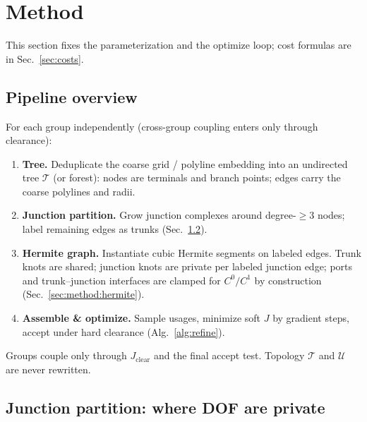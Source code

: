 
\section{Method}
\label{sec:method}

This section fixes the parameterization and the optimize loop; cost formulas
are in Sec.~\ref{sec:costs}.

\subsection{Pipeline overview}
\label{sec:method:pipeline}

For each group independently (cross-group coupling enters only through
clearance):

\begin{enumerate}
  \item \textbf{Tree.} Deduplicate the coarse grid / polyline embedding into an
        undirected tree $\mathcal{T}$ (or forest): nodes are terminals and
        branch points; edges carry the coarse polylines and radii.
  \item \textbf{Junction partition.} Grow junction complexes around
        degree-$\ge 3$ nodes; label remaining edges as trunks
        (Sec.~\ref{sec:method:partition}).
  \item \textbf{Hermite graph.} Instantiate cubic Hermite segments on labeled
        edges. Trunk knots are shared; junction knots are private per labeled
        junction edge; ports and trunk--junction interfaces are clamped for
        $C^{0}/C^{1}$ by construction (Sec.~\ref{sec:method:hermite}).
  \item \textbf{Assemble \& optimize.} Sample usages, minimize soft $J$ by
        gradient steps, accept under hard clearance (Alg.~\ref{alg:refine}).
\end{enumerate}

Groups couple only through $J_{\mathrm{clear}}$ and the final accept test.
Topology $\mathcal{T}$ and $\mathcal{U}$ are never rewritten.

\subsection{Junction partition: where DOF are private}
\label{sec:method:partition}

